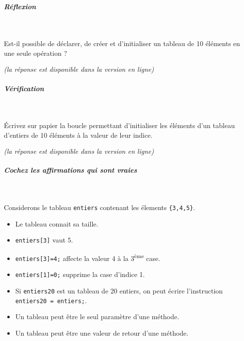 \documentclass[11pt,a4paper]{article}
\begin{document}
			
		\subparagraph{R\'eflexion} 
		
					\textcolor{white}{.} \par
				
            \par
          
					Est-il possible de d\'eclarer, de cr\'eer et d'initialiser un tableau de 10 \'el\'ements en une seule op\'eration ?  
				
            \par
         {\footnotesize\emph{(la r\'eponse est disponible dans la version en ligne)}\par} 
			
		\subparagraph{V\'erification} 
		
					\textcolor{white}{.} \par
				
            \par
        
					\'Ecrivez sur papier la boucle permettant d'initialiser
					les \'el\'ements d'un tableau d'entiers de 10 \'el\'ements \`a la valeur de leur indice.   
				
            \par
         {\footnotesize\emph{(la r\'eponse est disponible dans la version en ligne)}\par} 
			
		\subparagraph{Cochez les affirmations qui sont vraies} 
		
                \textcolor{white}{.} \par
            
							Considerons le tableau \verb|entiers|
							contenant les \'elements \verb|{3,4,5}|.
						
            \begin{itemize} 
        
            \item[ \ding{"6F} ] 
							Le tableau connait sa taille.
						
        
            \item[ \ding{"6F} ] \verb|entiers[3]| vaut 5.
						
        
            \item[ \ding{"6F} ] \verb|entiers[3]=4;| affecte la valeur 4 \`a la 3\textsuperscript{\`eme} case.
						
        
            \item[ \ding{"6F} ] \verb|entiers[1]=0;| supprime la case d'indice 1.
						
        
            \item[ \ding{"6F} ] 
							Si \verb|entiers20| est un tableau de 20 entiers, on peut \'ecrire l'instruction 
							\verb|entiers20 = entiers;|.  
						
        
            \item[ \ding{"6F} ] 
							Un tableau peut \^etre le seul param\`etre d'une m\'ethode.
						
        
            \item[ \ding{"6F} ] 
							Un tableau peut \^etre une valeur de retour d'une m\'ethode.
						
        
            \end{itemize} 
        
\end{document}
